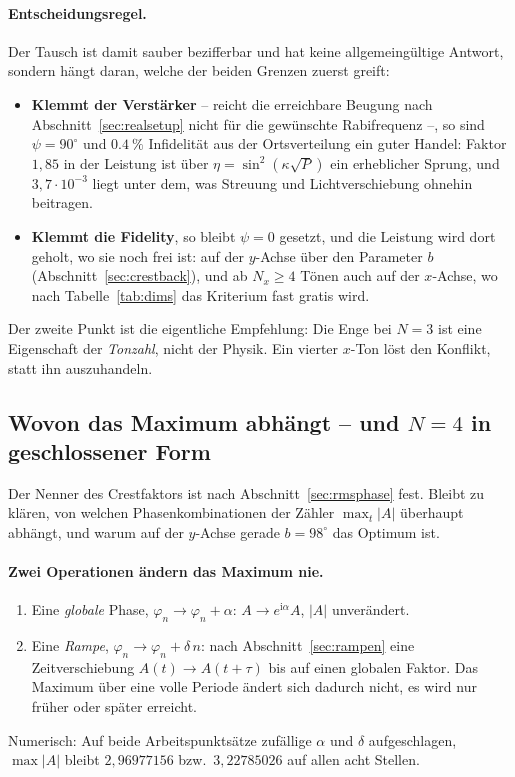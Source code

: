 \documentclass[11pt,a4paper]{article}
\begin{document}
\paragraph{Entscheidungsregel.}
Der Tausch ist damit sauber bezifferbar und hat keine allgemeingültige
Antwort, sondern hängt daran, welche der beiden Grenzen zuerst greift:

\begin{itemize}
  \item \textbf{Klemmt der Verstärker} -- reicht die erreichbare Beugung
    nach Abschnitt~\ref{sec:realsetup} nicht für die gewünschte
    Rabifrequenz --, so sind $\psi=90^\circ$ und $\SI{0.4}{\percent}$
    Infidelität aus der Ortsverteilung ein guter Handel: Faktor $1{,}85$ in
    der Leistung ist über $\eta=\sin^2(\kappa\sqrt{P})$ ein erheblicher
    Sprung, und $3{,}7\cdot10^{-3}$ liegt unter dem, was Streuung und
    Lichtverschiebung ohnehin beitragen.
  \item \textbf{Klemmt die Fidelity}, so bleibt $\psi=0$ gesetzt, und die
    Leistung wird dort geholt, wo sie noch frei ist: auf der $y$-Achse über
    den Parameter $b$ (Abschnitt~\ref{sec:crestback}), und ab $N_x\ge4$
    Tönen auch auf der $x$-Achse, wo nach Tabelle~\ref{tab:dims} das
    Kriterium fast gratis wird.
\end{itemize}

\noindent Der zweite Punkt ist die eigentliche Empfehlung: Die Enge bei
$N=3$ ist eine Eigenschaft der \emph{Tonzahl}, nicht der Physik. Ein
vierter $x$-Ton löst den Konflikt, statt ihn auszuhandeln.

\subsection{Wovon das Maximum abhängt -- und \boldmath$N=4$ in geschlossener Form}
\label{sec:n4}

Der Nenner des Crestfaktors ist nach Abschnitt~\ref{sec:rmsphase} fest.
Bleibt zu klären, von welchen Phasenkombinationen der Zähler $\max_t|A|$
überhaupt abhängt, und warum auf der $y$-Achse gerade $b=98^\circ$ das
Optimum ist.

\paragraph{Zwei Operationen ändern das Maximum nie.}
\begin{enumerate}\itemsep0.15em
  \item Eine \emph{globale} Phase, $\varphi_n\to\varphi_n+\alpha$:
        $A\to e^{\mathrm{i}\alpha}A$, $|A|$ unverändert.
  \item Eine \emph{Rampe}, $\varphi_n\to\varphi_n+\delta\,n$: nach
        Abschnitt~\ref{sec:rampen} eine Zeitverschiebung
        $A(t)\to A(t+\tau)$ bis auf einen globalen Faktor. Das Maximum
        über eine volle Periode ändert sich dadurch nicht, es wird nur
        früher oder später erreicht.
\end{enumerate}
Numerisch: Auf beide Arbeitspunktsätze zufällige $\alpha$ und $\delta$
aufgeschlagen, $\max|A|$ bleibt $2{,}96977156$ bzw.\ $3{,}22785026$ auf allen
acht Stellen.
\end{document}
